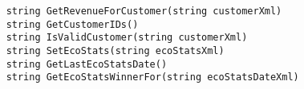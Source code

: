 \begin{verbatim}
    string GetRevenueForCustomer(string customerXml)
    string GetCustomerIDs()
    string IsValidCustomer(string customerXml)
    string SetEcoStats(string ecoStatsXml)
    string GetLastEcoStatsDate()
    string GetEcoStatsWinnerFor(string ecoStatsDateXml)
\end{verbatim}